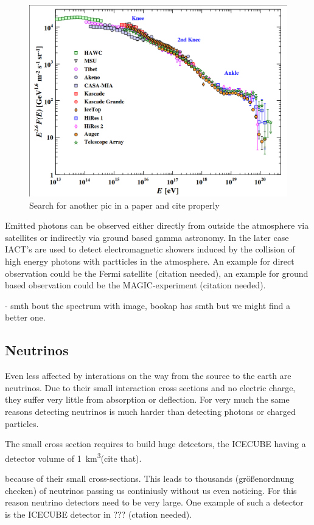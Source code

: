 \begin{figure}
	\includegraphics[width=.8\textwidth]{images/cr_spectrum.png}
	\caption{Search for another pic in a paper and cite properly}
	\label{fig:em_spectrum}
\end{figure}


Emitted photons can be observed either directly
from outside the atmosphere via satellites or indirectly
via ground based gamma astronomy. In the later case
IACT's are used to detect electromagnetic showers induced
by the collision of high energy photons with partticles in the atmosphere.
An example for direct observation could be the Fermi satellite (citation needed),
an example for ground based observation could be the
MAGIC-experiment (citation needed).

- smth bout the spectrum with image, bookap has smth but we might find a better one.

\subsection{Neutrinos}
Even less affected by interations on the way from the source to the earth are neutrinos.
Due to their small interaction cross sections and no electric charge, they 
suffer very little from absorption or deflection.
For very much the same reasons detecting neutrinos is much harder
than detecting photons or charged particles.

The small cross section requires to build huge detectors, 
the ICECUBE having a detector volume of \SI{1}{\kilo\meter^3}(cite that).

because of
their small cross-sections. This leads to thousands (größenordnung checken) of
neutrinos passing us continiusly without us even noticing.
For this reason neutrino detectors need to be very large. One example
of such a detector is the ICECUBE detector in ??? (ctation needed).

